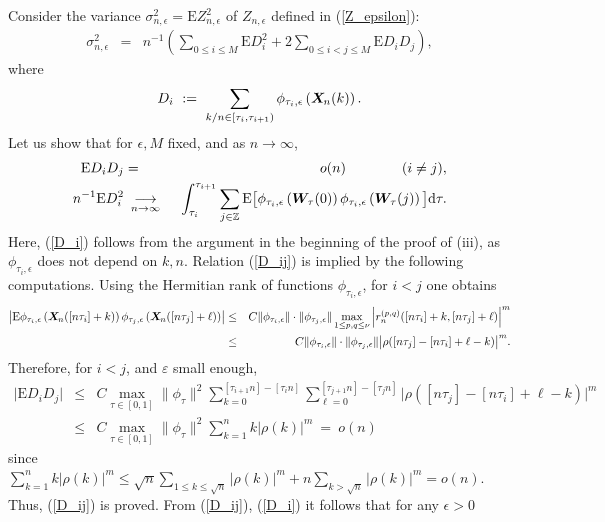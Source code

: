 \documentclass[10pt]{article}
\def\Z{\mathbb{Z}}
\def\d{\mathrm d}
\def\E{\mathrm E}
\newcommand{\mbf}[1]{\mbox{\boldmath $#1$}}
\def\limiten{\renewcommand{\arraystretch}{0.5}
\begin{array}[t]{c}
\stackrel{}{\longrightarrow} \\
{\scriptstyle n\rightarrow\infty}
\end{array}\renewcommand{\arraystretch}{1}}
\begin{document}
Consider the variance  $\sigma^2_{n,\epsilon} = \E
Z^2_{n,\epsilon}$ of $Z_{n,\epsilon} $ defined  in
(\ref{Z_epsilon}):
\begin{eqnarray*}
\sigma^2_{n,\epsilon} &=&n^{-1}\left(\sum_{0\le i \le M} \E D^2_i
+ 2\sum_{0\le i < j \le M} \E D_i D_j\right),
\end{eqnarray*}
where
$$
D_i \  := \   \sum_{k/n \in [\tau_i, \tau_{i+1})} \phi_{\tau_i,
\epsilon}\left({\mbf X}_{\! n}(k)\right).
$$
Let us show that for $\epsilon, M $ fixed, and as $n \to \infty $,
\begin{eqnarray}
\E D_i D_j &=&o(n)\qquad \qquad (i \neq j),  \label{D_ij}   \\
n^{-1}\E D_i^2&\limiten &\int_{\tau_i}^{\tau_{i+1}} \sum_{j\in
{\Z}} \E \big[\phi_{\tau_i,\epsilon} \left({\mbf W}_{\! \tau}(0)\right)
\phi_{\tau_i,\epsilon} \left({\mbf W}_{\! \tau}(j)\right) \big]\d \tau.
\label{D_i}
\end{eqnarray}
Here, (\ref{D_i}) follows from the argument in the beginning of the
proof of (iii),  as $\phi_{\tau_i,\epsilon}$ does not depend on $k,
n$.  Relation (\ref{D_ij}) is implied by the following computations.
Using the Hermitian rank of functions $\phi_{\tau_i, \epsilon}$, for
$i <j$ one obtains
\begin{eqnarray*}
\left|\E  \phi_{\tau_i, \epsilon}\left({\mbf X}_{\!
n}([n\tau_i]+k)\right) \phi_{\tau_j, \epsilon}\left({\mbf X}_{\!
n}([n\tau_j]+\ell)\right) \right| &\le & C \| \phi_{\tau_i,
\epsilon} \| \cdot  \| \phi_{\tau_j, \epsilon} \|\max_{1\le p,
q\le \nu} \left|r^{(p,q)}_n([n\tau_i]+k,[n\tau_j]+\ell)\right|^m\\
& \leq & C \| \phi_{\tau_i, \epsilon} \| \cdot  \| \phi_{\tau_j,
\epsilon} \|  \big | \rho ([n\tau_j]-[n\tau_i]+\ell-k)\big |^m.
\end{eqnarray*}
Therefore, for $i<j$, and $\varepsilon$ small enough,
\begin{eqnarray*}
\big | \E D_i D_j \big | & \leq & C \max_{\tau\in [0,1]} \|
\phi_{\tau} \|^2 \sum_{k=0}^{[\tau_{i+1}n]-[\tau_in]}
\sum_{\ell=0}^{[\tau_{j+1}n]-[\tau_jn]} \big | \rho
([n\tau_j]-[n\tau_i]+\ell-k)\big |^m \\
& \leq & C \max_{\tau\in [0,1]} \| \phi_{\tau} \|^2 \sum_{k=1}^n k
\big | \rho(k)\big |^m \ = \  o(n)
\end{eqnarray*}
since $\sum_{k=1}^n k \big | \rho(k)\big |^m \le \sqrt{n} \sum_{1\le
k \le \sqrt{n}} \big | \rho(k)\big |^m + n \sum_{k > \sqrt{n}} \big
| \rho(k)\big |^m = o(n)$. 
Thus, (\ref{D_ij}) is proved. From (\ref{D_ij}), (\ref{D_i}) it
follows that for any $\epsilon>0$
\end{document}
